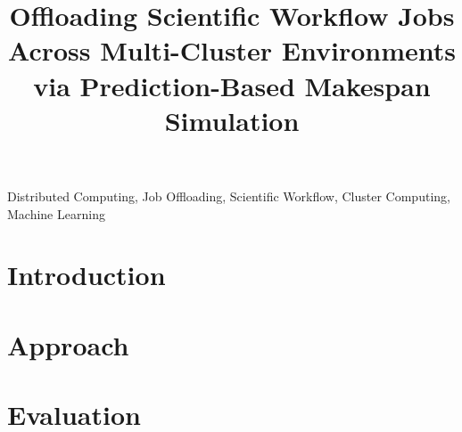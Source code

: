 \documentclass[conference]{IEEEtran}
\begin{document}

\title{Offloading Scientific Workflow Jobs Across Multi-Cluster Environments via Prediction-Based Makespan Simulation}

\author{



}


\maketitle

\begin{abstract}

\end{abstract}


\begin{IEEEkeywords}
Distributed Computing, Job Offloading, Scientific Workflow, Cluster Computing, Machine Learning
\end{IEEEkeywords}

\section{Introduction} %
\label{sec:introduction}


\section{Approach}
\label{sec:approach}


\section{Evaluation}
\label{sec:evaluation}

\end{document}
